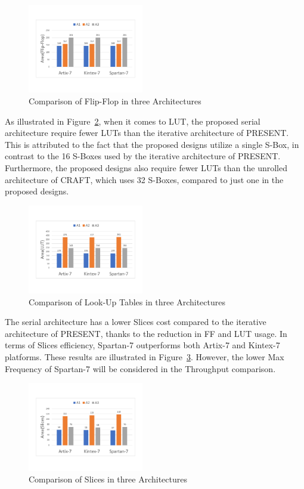 \documentclass[final,5p,times,twocolumn]{elsarticle}
\begin{document}
\begin{figure}
    \centering
    \includegraphics[width=0.45\textwidth]{./fig/compare-ff.pdf}
    \caption{Comparison of Flip-Flop in three Architectures}\label{compare_ff}
\end{figure}

As illustrated in Figure~\ref{compare_lut}, when it comes to LUT, the proposed serial architecture require fewer LUTs than the iterative architecture of PRESENT. This is attributed to the fact that the proposed designs utilize a single S-Box, in contrast to the 16 S-Boxes used by the iterative architecture of PRESENT. Furthermore, the proposed designs also require fewer LUTs than the unrolled architecture of CRAFT, which uses 32 S-Boxes, compared to just one in the proposed designs.

\begin{figure}
    \centering
    \includegraphics[width=0.45\textwidth]{./fig/compare-lut.pdf}
    \caption{Comparison of Look-Up Tables in three Architectures}\label{compare_lut}
\end{figure}

The serial architecture has a lower Slices cost compared to the iterative architecture of PRESENT, thanks to the reduction in FF and LUT usage.
In terms of Slices efficiency, Spartan-7 outperforms both Artix-7 and Kintex-7 platforms.
These results are illustrated in Figure~\ref{compare-slices}. However, the lower Max Frequency of Spartan-7 will be considered in the Throughput comparison.

\begin{figure}
    \centering
    \includegraphics[width=0.45\textwidth]{./fig/compare-slices.pdf}
    \caption{Comparison of Slices in three Architectures}\label{compare-slices}
\end{figure}
\end{document}
